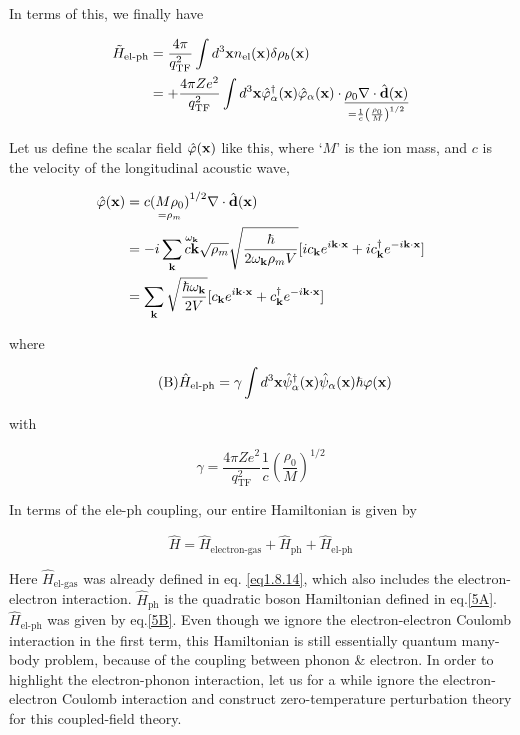 In terms of this, we finally have

\[\begin{split}
\tilde H_{\text{el-ph}} &= \frac{4\pi}{q_{\text{TF}}^2}\int d^3{\bf x} n_{\text{el}}({\bf x})\delta\rho_b({\bf x})\\
&= +\frac{4\pi Ze^2}{q_{\text{TF}}^2}\int d^3{\bf x}\hat{\varphi}_{\alpha}^\dagger({\bf x})\hat{\varphi}_{\alpha}({\bf x})\cdot\underset{=\frac{1}{c}\left(\frac{\rho_0}{M}\right)^{1/2}}{\underline{\rho_0\nabla\cdot\hat{\bf d}({\bf x})}}
\end{split} \]

Let us define the scalar field $\hat\varphi(\bf x)$ like this, where `$M$' is the ion mass, and $c$ is the velocity of the longitudinal acoustic wave,

\[\begin{split}
\hat\varphi({\bf x}) &= c\underset{=\rho_m}{(M\rho_0)}^{1/2}\nabla\cdot\hat{\bf d}({\bf x})\\
&=-i\sum_{\bf k}\overset{\omega_{\bf k}}{c{\bf k}}\sqrt{\rho_m}\sqrt{\frac{\hbar}{2\omega_{\bf k}\rho_m V}}[ic_{\bf k}e^{i\bf k\cdot x} + ic^\dagger_{\bf k}e^{-i\bf k\cdot x}]\\
&=\sum_{\bf k}\sqrt{\frac{\hbar\omega_{\bf k}}{2V}}[c_{\bf k}e^{i\bf k\cdot x} + c^\dagger_{\bf k}e^{-i\bf k\cdot x}]
\end{split}\]

where

\begin{align}\tag{B}\label{5B}
\hat{H}_{\text{el-ph}} = \gamma\int d^3{\bf x}\hat{\psi}_{\alpha}^\dagger({\bf x})\hat{\psi}_{\alpha}({\bf x})\hbar\varphi({\bf x})
\end{align}

with

\[\gamma = \frac{4\pi Ze^2}{q_{\text{TF}}^2}\frac{1}{c}\left(\frac{\rho_0}{M}\right)^{1/2} \]

In terms of the ele-ph coupling, our entire Hamiltonian is given by

\[\hat{H}=\hat{H}_{\text{electron-gas}}+\hat{H}_{\text{ph}}+\hat{H}_{\text{el-ph}} \]

Here $\hat{H}_{\text{el-gas}}$ was already defined in eq. \eqref{eq1.8.14}, which also includes the electron-electron interaction. $\hat{H}_{\text{ph}}$ is the quadratic boson Hamiltonian defined in eq.\eqref{5A}. $\hat{H}_{\text{el-ph}}$ was given by eq.\eqref{5B}. Even though we ignore the electron-electron Coulomb interaction in the first term, this Hamiltonian is still essentially quantum many-body problem, because of the coupling between phonon \& electron. In order to highlight the electron-phonon interaction, let us for a while ignore the electron-electron Coulomb interaction and construct zero-temperature perturbation theory for this coupled-field theory.

